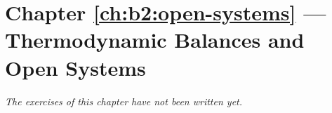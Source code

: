 \section*{Chapter \ref{ch:b2:open-systems} --- Thermodynamic Balances and Open Systems}


\emph{The exercises of this chapter have not been written yet.}

